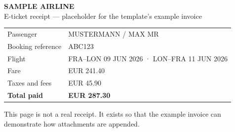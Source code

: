 \documentclass[11pt,a4paper]{article}
\begin{document}
\color{black!60}
{\Large\bfseries SAMPLE AIRLINE}\\[2mm]
E-ticket receipt --- placeholder for the template's example invoice\\[8mm]
\begin{tabular}{@{}ll@{}}
Passenger & MUSTERMANN / MAX MR\\
Booking reference & ABC123\\
Flight & FRA--LON 09 JUN 2026 · LON--FRA 11 JUN 2026\\
Fare & EUR 241.40\\
Taxes and fees & EUR 45.90\\
\textbf{Total paid} & \textbf{EUR 287.30}\\
\end{tabular}
\vfill
\small This page is not a real receipt. It exists so that the example invoice can
demonstrate how attachments are appended.
\end{document}
